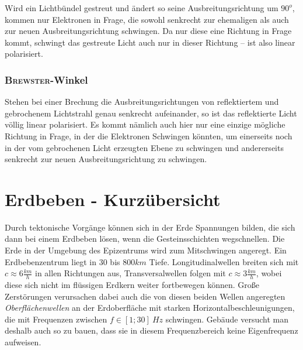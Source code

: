Wird ein Lichtbündel gestreut und ändert so seine Ausbreitungsrichtung um \(90^o\), kommen nur Elektronen in Frage, die sowohl senkrecht zur ehemaligen als auch zur neuen Ausbreitungsrichtung schwingen. Da nur diese eine Richtung in Frage kommt, schwingt das gestreute Licht auch nur in dieser Richtung -- ist also linear polarisiert.


		\subsection{\textsc{Brewster}-Winkel}

Stehen bei einer Brechung die Ausbreitungsrichtungen von reflektiertem und gebrochenem Lichtstrahl genau senkrecht aufeinander, so ist das reflektierte Licht völlig linear polarisiert. Es kommt nämlich auch hier nur eine einzige mögliche Richtung in Frage, in der die Elektronen Schwingen könnten, um einerseits noch in der vom gebrochenen Licht erzeugten Ebene zu schwingen und andererseits senkrecht zur neuen Ausbreitungsrichtung zu schwingen. 








		\chapter{Erdbeben - Kurzübersicht}


Durch tektonische Vorgänge können sich in der Erde Spannungen bilden, die sich dann bei einem Erdbeben lösen, wenn die Gesteinsschichten wegschnellen. Die Erde in der Umgebung des Epizentrums wird zum Mitschwingen angeregt. Ein Erdbebenzentrum liegt in \(30\) bis \(800 km\) Tiefe. Longitudinalwellen breiten sich mit \(c \approx 6 \frac{km}{h}\) in allen Richtungen aus, Transversalwellen folgen mit \(c \approx 3 \frac{km}{h}\), wobei diese sich nicht im flüssigen Erdkern weiter fortbewegen können. Große Zerstörungen verursachen dabei auch die von diesen beiden Wellen angeregten \textit{Oberflächenwellen} an der Erdoberfläche mit starken Horizontalbeschleunigungen, die mit Frequenzen zwischen \(f \in [1;30] ~ Hz\) schwingen. Gebäude versucht man deshalb auch so zu bauen, dass sie in diesem Frequenzbereich keine Eigenfrequenz aufweisen.










